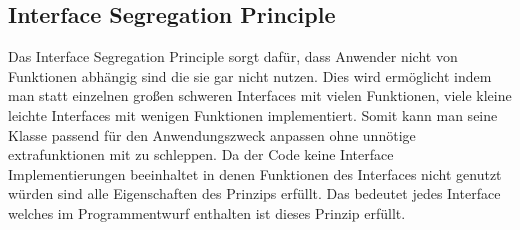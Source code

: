 \subsection{Interface Segregation Principle}
Das Interface Segregation Principle sorgt dafür, dass Anwender nicht von Funktionen abhängig sind die sie gar nicht nutzen.
Dies wird ermöglicht indem man statt einzelnen großen schweren Interfaces mit vielen Funktionen, viele kleine leichte Interfaces mit wenigen Funktionen implementiert.
Somit kann man seine Klasse passend für den Anwendungszweck anpassen ohne unnötige extrafunktionen mit zu schleppen.
Da der Code keine Interface Implementierungen beeinhaltet in denen Funktionen des Interfaces nicht genutzt würden sind alle Eigenschaften des Prinzips erfüllt.
Das bedeutet jedes Interface welches im Programmentwurf enthalten ist dieses Prinzip erfüllt.

